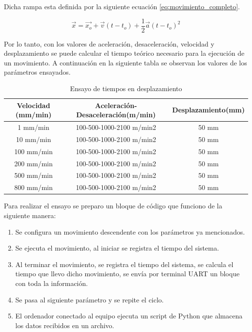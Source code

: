Dicha rampa esta definida por la siguiente ecuación \ref{eq:movimiento_completo}.

\begin{equation}
	\label{eq:movimiento_completo}
	\vec{x}=\vec{x_o}+\vec{v}(t-t_o)+\frac12 \vec {a} (t-t_o)^2
\end{equation}

Por lo tanto, con los valores de aceleración, desaceleración, velocidad y desplazamiento se puede calcular el tiempo teórico necesario para la ejecución de un movimiento.
A continuación en la siguiente tabla se observan los valores de los parámetros ensayados.

\begin{table}[h]
	\centering
	\caption[Ensayo de tiempo en desplazamientos]{Ensayo de tiempos en desplazamiento}
	\begin{tabular}{c c c }    
		\toprule
		\textbf{Velocidad (mm/min)}     & \textbf{Aceleración-Desaceleración(m/min)} & \textbf{Desplazamiento(mm)} \\
		\midrule
		1  mm/min	 & 	   100-500-1000-2100 m/min2     & 	50 mm 			 	\\		
		10  mm/min   & 	   100-500-1000-2100 m/min2 	& 	50 mm				\\
		100  mm/min  & 	   100-500-1000-2100 m/min2	    & 	50 mm 				\\
		200  mm/min	 & 	   100-500-1000-2100 m/min2	    & 	50 mm 			\\
		500  mm/min	 & 	   100-500-1000-2100 m/min2     & 	50 mm					\\
		800  mm/min	 & 	   100-500-1000-2100 m/min2     & 	50 mm					\\
		\bottomrule
		\hline
	\end{tabular}
	\label{tab:ensayo_comandos}
\end{table}

Para realizar el ensayo se preparo un bloque de código que funciono de la siguiente manera:

\begin{enumerate}
\item Se configura un movimiento descendente con los parámetros ya mencionados.
\item Se ejecuta el movimiento, al iniciar se registra el tiempo del sistema.
\item Al terminar el movimiento, se registra el tiempo del sistema, se calcula el tiempo que llevo dicho movimiento, se envía por terminal UART un bloque con toda la información.
\item Se pasa al siguiente parámetro y se repite el ciclo.
\item El ordenador conectado al equipo ejecuta un script de Python que almacena los datos recibidos en un archivo.
\end{enumerate}


